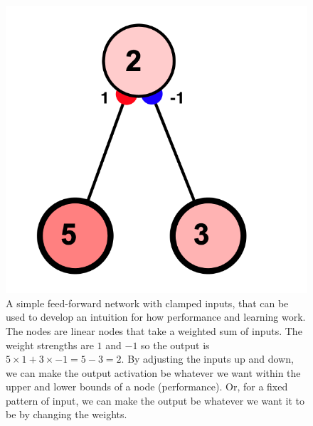 \begin{figure}[h]
\centering
\includegraphics[scale=.5]{./images/2NodeSimpleFF.png}
\caption[Simbrain screenshot.]{A simple feed-forward network with clamped inputs, that can be used to develop an intuition for how performance and learning work. The nodes are linear nodes that take a weighted sum of inputs. The weight strengths are $1$ and $-1$ so the output is $5 \times 1 + 3 \times -1 = 5 - 3 = 2$. By adjusting the inputs up and down, we can make the output activation be whatever we want within the upper and lower bounds of a node (performance). Or, for a fixed pattern of input, we can make the output be whatever we want it to be by changing the weights.}
\label{2NodeSimpleFF}
\end{figure}

